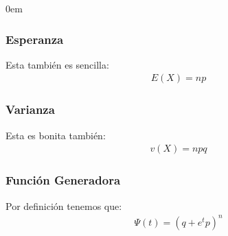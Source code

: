 \documentclass[12pt, fleqn]{report}                             %
\newenvironment{SmallIndentation}[1][0.75em]                    %
        {\begin{adjustwidth}{#1}{}\begin{footnotesize}}             %
        {\end{footnotesize}\end{adjustwidth}}                       %
\theoremstyle{break}                                            %
\newcommand{\Wrap}[1]           {\left( #1 \right)}             %
\begin{document}
\begin{multicols}{2}
\begin{SmallIndentation}[0em]
                    \subsubsection{Esperanza}  

                        Esta también es sencilla:
                        \begin{align*}
                            E(X) = np
                        \end{align*}


                    \subsubsection{Varianza}

                        Esta es bonita también:
                        \begin{align*}
                            v(X) = npq   
                        \end{align*}

                    \subsubsection{Función Generadora}  

                        Por definición tenemos que:
                        \begin{align*}
                            \Psi (t) = \Wrap{q + e^tp}^n   
                        \end{align*}


\end{SmallIndentation}
\end{multicols}
\end{document}

